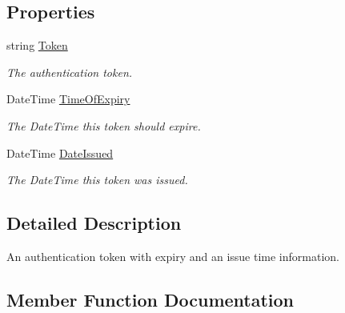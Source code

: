 \subsection*{Properties}
\begin{DoxyCompactItemize}
\item 
string \hyperlink{classCqrs_1_1Authentication_1_1SingleSignOnToken_a7a704dd5d4f396e5c0b413b4b39e7406_a7a704dd5d4f396e5c0b413b4b39e7406}{Token}
\begin{DoxyCompactList}\small\item\em The authentication token. \end{DoxyCompactList}\item 
Date\+Time \hyperlink{classCqrs_1_1Authentication_1_1SingleSignOnToken_a3e9a9ee37ec53edd665e4e8d46f73f85_a3e9a9ee37ec53edd665e4e8d46f73f85}{Time\+Of\+Expiry}
\begin{DoxyCompactList}\small\item\em The Date\+Time this token should expire. \end{DoxyCompactList}\item 
Date\+Time \hyperlink{classCqrs_1_1Authentication_1_1SingleSignOnToken_aa0ea2d0654dd2aab23af98806663cd7c_aa0ea2d0654dd2aab23af98806663cd7c}{Date\+Issued}
\begin{DoxyCompactList}\small\item\em The Date\+Time this token was issued. \end{DoxyCompactList}\end{DoxyCompactItemize}


\subsection{Detailed Description}
An authentication token with expiry and an issue time information. 



\subsection{Member Function Documentation}
\mbox{\label{classCqrs_1_1Authentication_1_1SingleSignOnToken_a5e859c6c5db5aaa9ef4e8f2086df4604_a5e859c6c5db5aaa9ef4e8f2086df4604}} 
